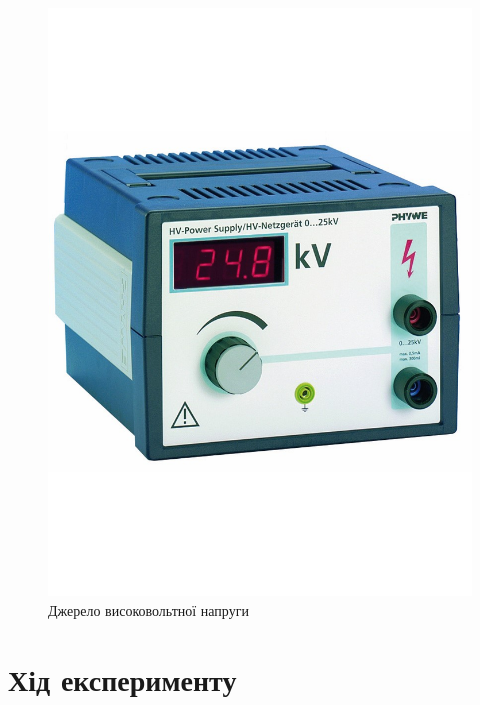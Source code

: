 \documentclass{LabWork}
\begin{document}
\begin{figure}[htbp!]
\begin{minipage}[t]{0.47\linewidth}
			\includegraphics[width=0.9\linewidth]{DCPower}
			\caption{Джерело високовольтної напруги}
			\label{pic:DCPower}
	\end{minipage}
\end{figure}



\section{Хід експерименту}
\end{document}
